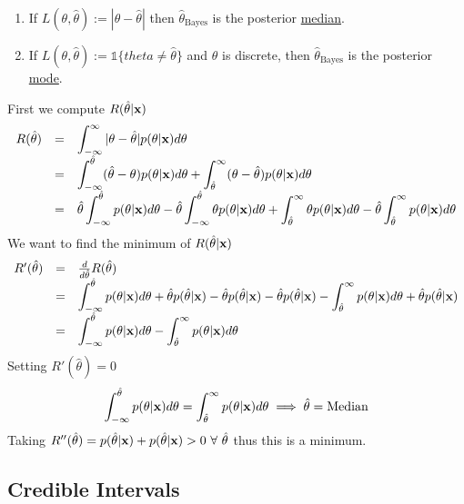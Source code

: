 \documentclass[11pt,a4paper]{article}
\begin{document}
\begin{enumerate}
	\item If $L(\theta,\hat\theta):=|\theta-\hat\theta|$ then $\hat\theta_\text{Bayes}$ is the posterior \underline{median}.
	\item If $L(\theta,\hat\theta):=\mathds{1}\{theta\neq\hat\theta\}$ and $\theta$ is discrete, then $\hat\theta_\text{Bayes}$ is the posterior \underline{mode}.
\end{enumerate}

First we compute $R(\hat\theta|\textbf{x})$
\[\begin{array}{rcl}
R(\hat\theta)&=&\displaystyle\int_{-\infty}^\infty|\theta-\hat\theta|p(\theta|\textbf{x})d\theta\\
&=&\displaystyle\int_{-\infty}^{\hat\theta}(\hat\theta-\theta)p(\theta|\textbf{x})d\theta+\displaystyle\int_{\hat\theta}^\infty(\theta-\hat\theta)p(\theta|\textbf{x})d\theta\\
&=&\hat\theta\displaystyle\int_{-\infty}^{\hat\theta}p(\theta|\textbf{x})d\theta-\hat\theta\displaystyle\int_{-\infty}^{\hat\theta}\theta p(\theta|\textbf{x})d\theta+\displaystyle\int_{\hat\theta}^\infty\theta p(\theta|\textbf{x})d\theta-\hat\theta\displaystyle\int_{\hat\theta}^\infty p(\theta|\textbf{x})d\theta\\
\end{array}\]
We want to find the minimum of $R(\hat\theta|\textbf{x})$
\[\begin{array}{rcl}
R'(\hat\theta)&=&\frac{d}{d\hat\theta}R(\hat\theta)\\
&=&\displaystyle\int_{-\infty}^{\hat\theta}p(\theta|\textbf{x})d\theta+\hat\theta p(\hat\theta|\textbf{x})-\hat\theta p(\hat\theta|\textbf{x})-\hat\theta p(\hat\theta|\textbf{x})-\displaystyle\int_{\hat\theta}^\infty p(\theta|\textbf{x})d\theta+\hat\theta p(\hat\theta|\textbf{x})\\
&=&\displaystyle\int_{-\infty}^{\hat\theta}p(\theta|\textbf{x})d\theta-\displaystyle\int_{\hat\theta}^\infty p(\theta|\textbf{x})d\theta
\end{array}\]
Setting $R'(\hat\theta)=0$
$$\displaystyle\int_{-\infty}^{\hat\theta}p(\theta|\textbf{x})d\theta=\displaystyle\int_{\hat\theta}^\infty p(\theta|\textbf{x})d\theta\implies\hat\theta=\text{Median}$$
Taking $R''(\hat\theta)=p(\hat\theta|\x)+p(\hat\theta|\x)>0\ \forall\ \hat\theta$ thus this is a minimum.

\subsection{Credible Intervals}
\end{document}
